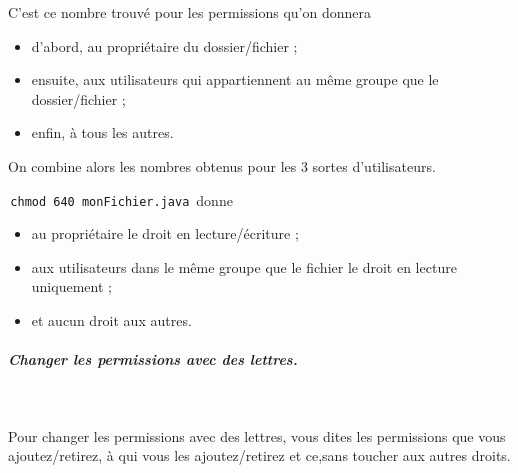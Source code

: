 \documentclass[11pt,a4paper]{article}
\begin{document}
				C'est ce nombre trouv\'e pour les permissions qu'on donnera 
				
					\begin{itemize}
				
			\item d'abord, au propri\'etaire du dossier/fichier ;
			\item ensuite, aux utilisateurs qui appartiennent au m\^eme groupe que le dossier/fichier ;
			\item enfin, \`a tous les autres. 
					\end{itemize}
				
          On combine alors les nombres obtenus pour les 3 sortes d'utilisateurs.
				
            \par
        \,\verb|chmod 640 monFichier.java|\, donne 
				  
					\begin{itemize}
				
			\item au propri\'etaire le droit en lecture/\'ecriture ;
			\item aux utilisateurs dans le m\^eme groupe que le fichier le droit en lecture uniquement ; 
			\item et aucun droit aux autres.
					\end{itemize}
				
            \par
        
			
		\subparagraph{Changer les permissions avec des lettres.} 
		
					\textcolor{white}{.} \par
				
            \par
        
				  Pour changer les permissions avec des lettres, vous dites les permissions que vous ajoutez/retirez, \`a qui vous les ajoutez/retirez et ce,sans toucher aux autres droits.
				  
\end{document}
